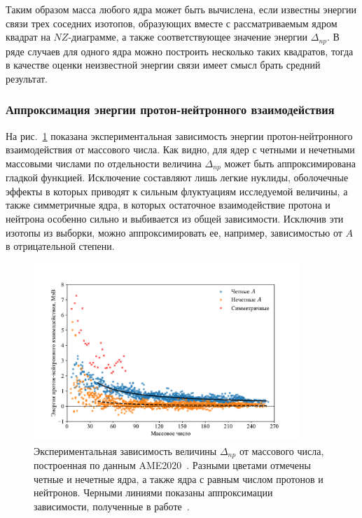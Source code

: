Таким образом масса любого ядра может быть вычислена, если известны энергии связи трех соседних изотопов, образующих вместе с рассматриваемым ядром квадрат на $NZ$-диаграмме, а также соответствующее значение энергии $\Delta_{np}$. В ряде случаев для одного ядра можно построить несколько таких квадратов, тогда в качестве оценки неизвестной энергии связи имеет смысл брать средний результат.

\subsubsection{Аппроксимация энергии протон-нейтронного взаимодействия}
На рис.~\ref{fig:delta_np} показана экспериментальная зависимость энергии протон-нейтронного взаимодействия от массового числа. Как видно, для ядер с четными и нечетными массовыми числами по отдельности величина $\Delta_{np}$ может быть аппроксимирована гладкой функцией. Исключение составляют лишь легкие нуклиды, оболочечные эффекты в которых приводят к сильным флуктуациям исследуемой величины, а также симметричные ядра, в которых остаточное взаимодействие протона и нейтрона особенно сильно и выбивается из общей зависимости. Исключив эти изотопы из выборки, можно аппроксимировать ее, например, зависимостью от $A$ в отрицательной степени.

\begin{figure}
  \centering
  \includegraphics[width=0.9\textwidth]{pics/delta_np.pdf}
  \caption{Экспериментальная зависимость величины $\Delta_{np}$ от массового числа, построенная по данным AME2020~\cite{huang2021}. Разными цветами отмечены четные и нечетные ядра, а также ядра с равным числом протонов и нейтронов. Черными линиями показаны аппроксимации зависимости, полученные в работе~\cite{vladimirova2022}.}
  \label{fig:delta_np}
\end{figure}

